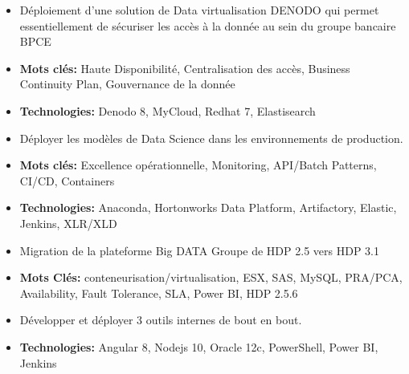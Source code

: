 \documentclass[10pt,a4paper,ragged2e]{altacv}
\begin{document}
\begin{paracol}{2}
\divider
{}
\begin{itemize}
\item Déploiement d'une solution de Data virtualisation DENODO qui permet essentiellement de sécuriser les accès à la donnée au sein du groupe bancaire BPCE
\item \textbf{Mots clés:} Haute Disponibilité, Centralisation des accès, Business Continuity Plan, Gouvernance de la donnée  
\item \textbf{Technologies:} Denodo 8, MyCloud, Redhat 7, Elastisearch
\medskip
\end{itemize}
\divider

\begin{itemize}
\item Déployer les modèles de Data Science dans les environnements de production.
\item \textbf{Mots clés:} Excellence opérationnelle, Monitoring, API/Batch Patterns, CI/CD, Containers
\item \textbf{Technologies:} Anaconda, Hortonworks Data Platform, Artifactory, Elastic, Jenkins, XLR/XLD
\medskip
\end{itemize}

\divider
{}
\begin{itemize}
\item Migration de la plateforme Big DATA Groupe de HDP 2.5 vers HDP 3.1
\item \textbf{Mots Clés:} conteneurisation/virtualisation, ESX, SAS, MySQL, PRA/PCA, Availability, Fault Tolerance, SLA, Power BI, HDP 2.5.6
\end{itemize}

\divider
{}
\begin{itemize}
\item Développer et déployer 3 outils internes de bout en bout.
\item \textbf{Technologies:} Angular 8, Nodejs 10, Oracle 12c, PowerShell, Power BI, Jenkins
\end{itemize}
\medskip




\end{paracol}
\end{document}

